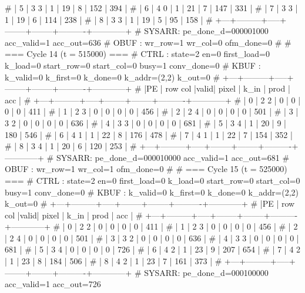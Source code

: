 # | 5 |   3   3 |  1  |     19 |      8 |      152 |        394 |
# | 6 |   4   0 |  1  |     21 |      7 |      147 |        331 |
# | 7 |   3   3 |  1  |     19 |      6 |      114 |        238 |
# | 8 |   3   3 |  1  |     19 |      5 |       95 |        158 |
# +---+---------+-----+--------+--------+----------+------------+
# SYSARR: pe_done_d=000001000 acc_valid=1 acc_out=636
# OBUF : wr_row=1 wr_col=0 ofm_done=0
# 
# === Cycle 14  (t = 515000) ===
# CTRL : state=2 en=0 first_load=0 k_load=0 start_row=0 start_col=0 busy=1 conv_done=0
# KBUF : k_valid=0 k_first=0 k_done=0 k_addr=(2,2) k_out=0
# +---+---------+-----+--------+--------+----------+------------+
# |PE | row col |valid| pixel  |  k_in  |   prod   |    acc     |
# +---+---------+-----+--------+--------+----------+------------+
# | 0 |   2   2 |  0  |      0 |      0 |        0 |        411 |
# | 1 |   2   3 |  0  |      0 |      0 |        0 |        456 |
# | 2 |   2   4 |  0  |      0 |      0 |        0 |        501 |
# | 3 |   3   2 |  0  |      0 |      0 |        0 |        636 |
# | 4 |   3   3 |  0  |      0 |      0 |        0 |        681 |
# | 5 |   3   4 |  1  |     20 |      9 |      180 |        546 |
# | 6 |   4   1 |  1  |     22 |      8 |      176 |        478 |
# | 7 |   4   1 |  1  |     22 |      7 |      154 |        352 |
# | 8 |   3   4 |  1  |     20 |      6 |      120 |        253 |
# +---+---------+-----+--------+--------+----------+------------+
# SYSARR: pe_done_d=000010000 acc_valid=1 acc_out=681
# OBUF : wr_row=1 wr_col=1 ofm_done=0
# 
# === Cycle 15  (t = 525000) ===
# CTRL : state=2 en=0 first_load=0 k_load=0 start_row=0 start_col=0 busy=1 conv_done=0
# KBUF : k_valid=0 k_first=0 k_done=0 k_addr=(2,2) k_out=0
# +---+---------+-----+--------+--------+----------+------------+
# |PE | row col |valid| pixel  |  k_in  |   prod   |    acc     |
# +---+---------+-----+--------+--------+----------+------------+
# | 0 |   2   2 |  0  |      0 |      0 |        0 |        411 |
# | 1 |   2   3 |  0  |      0 |      0 |        0 |        456 |
# | 2 |   2   4 |  0  |      0 |      0 |        0 |        501 |
# | 3 |   3   2 |  0  |      0 |      0 |        0 |        636 |
# | 4 |   3   3 |  0  |      0 |      0 |        0 |        681 |
# | 5 |   3   4 |  0  |      0 |      0 |        0 |        726 |
# | 6 |   4   2 |  1  |     23 |      9 |      207 |        654 |
# | 7 |   4   2 |  1  |     23 |      8 |      184 |        506 |
# | 8 |   4   2 |  1  |     23 |      7 |      161 |        373 |
# +---+---------+-----+--------+--------+----------+------------+
# SYSARR: pe_done_d=000100000 acc_valid=1 acc_out=726

